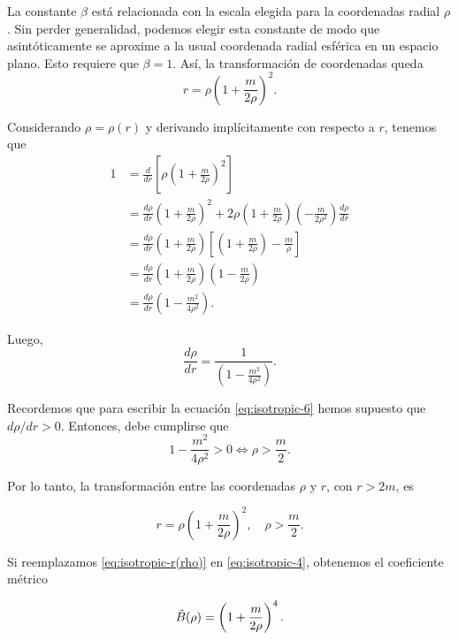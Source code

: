 \documentclass[letterpaper,11pt]{article}
\begin{document}
La constante $\beta$ está relacionada con la escala elegida para la coordenadas radial $\rho$. Sin perder generalidad, podemos elegir esta constante de modo que asintóticamente se aproxime a la usual coordenada radial esférica en un espacio plano. Esto requiere que $\beta = 1$. Así, la transformación de coordenadas queda 
\begin{equation}
r = \rho \left( 1 + \frac{m}{2\rho} \right)^2.
\end{equation}

Considerando $\rho = \rho(r)$ y derivando implícitamente con respecto a $r$, tenemos que
\begin{align}
1 &= \frac{d}{dr} \left[ \rho \left( 1 + \frac{m}{2\rho} \right)^2 \right] \\
 &= \frac{d\rho}{dr} \left( 1 + \frac{m}{2\rho} \right)^2 + 2 \rho \left( 1 + \frac{m}{2\rho} \right) \left( - \frac{m}{2\rho^2} \right) \frac{d\rho}{dr} \\
 &= \frac{d\rho}{dr} \left(1 + \frac{m}{2\rho} \right) \left[ \left(1 + \frac{m}{2\rho} \right) - \frac{m}{\rho}\right] \\
 &= \frac{d\rho}{dr} \left(1 + \frac{m}{2\rho} \right)  \left(1 - \frac{m}{2\rho} \right) \\
 &= \frac{d\rho}{dr} \left(1 - \frac{m^2}{4\rho^2} \right). 
\end{align}

Luego, 
\begin{equation}
\frac{d\rho}{dr} = \frac{1}{ \left(1 - \frac{m^2}{4\rho^2} \right)}.
\end{equation}

Recordemos que para escribir la ecuación \eqref{eq:isotropic-6} hemos supuesto que  $d\rho/dr > 0$. Entonces, debe cumplirse que 
\begin{equation}
1 - \frac{m^2}{4\rho^2} > 0 \Leftrightarrow \rho >  \frac{m}{2}.
\end{equation}

Por lo tanto, la transformación entre las coordenadas $\rho$ y $r$, con $r > 2m$, es
\begin{shaded}
\begin{equation} \label{eq:isotropic-r(rho)}
    r = \rho \left( 1 + \frac{m}{2\rho} \right)^2, \quad \rho > \frac{m}{2}.
\end{equation}    
\end{shaded}

Si reemplazamos \eqref{eq:isotropic-r(rho)} en \eqref{eq:isotropic-4}, obtenemos el coeficiente métrico 
\begin{shaded}
\begin{equation} \label{eq:metric-isotropic-B}
    \Tilde{B}(\rho) = \left( 1 + \frac{m}{2\rho} \right)^4.
\end{equation}    
\end{shaded}
\end{document}
